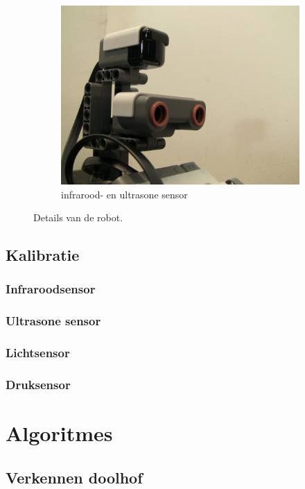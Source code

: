\documentclass[tt3]{penoverslag}
\begin{document}
\begin{figure}
\begin{subfigure}[h]{0.325\textwidth}
		\includegraphics[width=\textwidth]{robotSensoren}
		\caption{infrarood- en ultrasone sensor}
	\end{subfigure}
\caption{Details van de robot.}
\label{fig:robotDetail}
\end{figure}

\subsection{Kalibratie}
\label{ssec:Kalib}
\subsubsection{Infraroodsensor}
\subsubsection{Ultrasone sensor}
\subsubsection{Lichtsensor}
\subsubsection{Druksensor}

\section{Algoritmes}
\label{sec:Algo}

\subsection{Verkennen doolhof}
\label{ssec: verkenDool}
\end{document}
